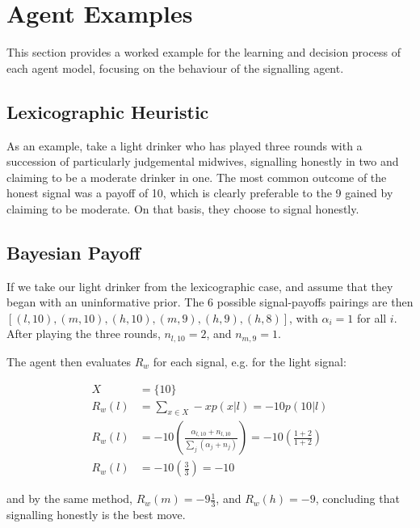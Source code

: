 \section{Agent Examples}
\label{sec:agent_eg}

This section provides a worked example for the learning and decision process of each agent model, focusing on the behaviour of the signalling agent.

\subsection{Lexicographic Heuristic}
\label{sub:lexico_eg}

As an example, take a light drinker who has played three rounds with a succession of particularly judgemental midwives, signalling honestly in two and claiming to be a moderate drinker in one. The most common outcome of the honest signal was a payoff of 10, which is clearly preferable to the 9 gained by claiming to be moderate. On that basis, they choose to signal honestly.

\subsection{Bayesian Payoff}
\label{sub:payoff_eg}

If we take our light drinker from the lexicographic case, and assume that they began with an uninformative prior. The 6 possible signal-payoffs pairings are then \([(l,10),(m,10),(h,10),(m,9),(h,9),(h,8)]\), with \(\alpha_{i}=1\) for all \(i\). After playing the three rounds, \(n_{l,10}=2\), and \(n_{m,9}=1\).

The agent then evaluates \(R_{w}\) for each signal, e.g. for the light signal:

\begin{equation*}
\begin{aligned}
X &= \{10\}\\
R_{w}(l) &= \sum_{x \in X} -xp(x | l) = -10p(10 | l)\\
R_{w}(l) &= -10(\frac{\alpha_{l,10}+n_{l,10}}{\sum_{j}(\alpha_{j}+n_{j})}) = -10(\frac{1+2}{1+2})\\
R_{w}(l) &= -10(\frac{3}{3}) = -10
\end{aligned}
\end{equation*}

and by the same method, \(R_{w}(m)=-9\frac{1}{3}\), and \(R_{w}(h)=-9\), concluding that signalling honestly is the best move.

